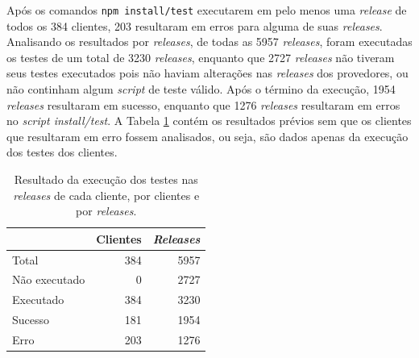 Após os comandos \texttt{npm install/test} executarem em pelo menos uma \textit{release} de todos os 384 clientes, 203 resultaram em erros para alguma de suas \textit{releases}. Analisando os resultados por \textit{releases}, de todas as 5957 \textit{releases}, foram executadas os testes de um total de 3230 \textit{releases}, enquanto que 2727 \textit{releases} não tiveram seus testes executados pois não haviam alterações nas \textit{releases} dos provedores, ou não continham algum \textit{script} de teste válido. Após o término da execução, 1954 \textit{releases} resultaram em sucesso, enquanto que 1276 \textit{releases} resultaram em erros no \textit{script install/test}. A Tabela \ref{tab:res_rq1_1} contém os resultados prévios sem que os clientes que resultaram em erro fossem analisados, ou seja, são dados apenas da execução dos testes dos clientes.

\begin{table}[]
\centering
\begin{tabular}{lrr}
\toprule
                    & Clientes & \textit{Releases} \\ \hline
    Total           & 384     & 5957     \\
    Não executado   & 0       & 2727     \\
    Executado       & 384     & 3230     \\
    Sucesso         & 181     & 1954     \\
    Erro            & 203     & 1276     \\ \bottomrule
\end{tabular}

\caption{Resultado da execução dos testes nas \textit{releases} de cada cliente, por clientes e por \textit{releases}.}
\label{tab:res_rq1_1}
\end{table}


